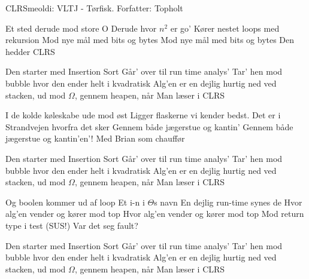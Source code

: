 \begin{sang}{CLRS}{meoldi: VLTJ - Tørfisk. Forfatter: Topholt}
    \begin{vers}
    Et sted derude mod store O
    Derude hvor $n^2$ er go'
    Kører nestet loops med rekursion
    Mod nye mål med bits og bytes
    Mod nye mål med bits og bytes
    Den hedder CLRS
    \end{vers}
    
    \begin{omkvaed}
    Den starter med Insertion Sort
    Går' over til run time analys' 
    Tar' hen mod bubble hvor den ender helt i kvadratisk
    Alg'en er en dejlig hurtig ned ved stacken, ud mod $\Omega$, gennem heapen, når
    Man læser i CLRS
    \end{omkvaed}
    
    \begin{vers}
    I de kolde køleskabe ude mod øst
    Ligger flaskerne vi kender bedst.
    Det er i Strandvejen hvorfra det sker
    Gennem både jægerstue og kantin'
    Gennem både jægerstue og kantin'en'!
    Med Brian som chauffør
    \end{vers}
    
    \begin{omkvaed}
    Den starter med Insertion Sort
    Går' over til run time analys' 
    Tar' hen mod bubble hvor den ender helt i kvadratisk
    Alg'en er en dejlig hurtig ned ved stacken, ud mod $\Omega$, gennem heapen, når
    Man læser i CLRS
    \end{omkvaed}
    
    \begin{vers}
    Og boolen kommer ud af loop
    Et i-n i $\Theta$s navn
    En dejlig run-time synes de
    Hvor alg'en vender og kører mod top
    Hvor alg'en vender og kører mod top
    Mod return type i test (SUS!)
    Var det seg fault?
    \end{vers}
    
    \begin{omkvaed}
    Den starter med Insertion Sort
    Går' over til run time analys' 
    Tar' hen mod bubble hvor den ender helt i kvadratisk
    Alg'en er en dejlig hurtig ned ved stacken, ud mod $\Omega$, gennem heapen, når
    Man læser i CLRS
    \end{omkvaed}
    \end{sang}